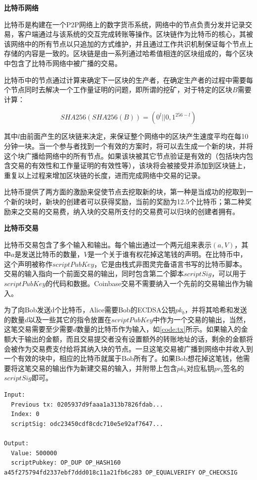 \noindent\textbf{比特币网络}

比特币是构建在一个P2P网络上的数字货币系统，网络中的节点负责分发并记录交易，客户端通过与该系统的交互完成转账等操作。区块链作为比特币的核心，其被该网络中的所有节点以只追加的方式维护，并且通过工作共识机制保证每个节点上存储的内容是一致的。区块链是由一系列通过哈希值相连的区块组成的，每个区块中包含了比特币网络中被广播的交易。

比特币中的节点通过计算来确定下一区块的生产者，在确定生产者的过程中需要每个节点同时去解决一个工作量证明的问题，即所谓的挖矿，对于特定的区块$B$需要计算：

\begin{equation}\label{eqGenCmpPk}
SHA256(SHA256(B)) = (0^l||{0,1}^{256-l})
\end{equation}

其中$l$由前面产生的区块链来决定，来保证整个网络中的区块产生速度平均在每10分钟一块。当一个参与者找到一个有效的方案时，将可以去生成一个新的块，并将这个块广播给网络中的所有节点。如果该块被其它节点验证是有效的（包括块内包含交易的有效性和工作量证明的有效性等），该块将会被接受并添加到区块链上，重复以上过程来增加区块链的长度，进而完成网络中交易的记录。

比特币提供了两方面的激励来促使节点去挖取新的块，第一种是当成功的挖取到一个新的块时，新块的创建者可以获得奖励，当前的奖励为12.5个比特币；第二种奖励来之交易的交易费，纳入块的交易所支付的交易费可以归块的创建者拥有。


\noindent\textbf{比特币交易}

比特币交易包含了多个输入和输出。每个输出通过一个两元组来表示$(a,V)$，其中$a$是发送比特币的数量，$V$是一个关于谁有权花掉这笔钱的声明。在比特币中，这个声明被称作$scriptPubKey$，它是由栈式非图灵完备语言书写的比特币脚本。交易的输入指向一个前面交易的输出，同时包含第二个脚本$scriptSig$，可以用于$scriptPubKey$的代码和数据。Coinbase交易不需要纳入一个先前的交易输出作为输入。

为了向Bob发送d个比特币，Alice需要Bob的ECDSA公钥$pk_b$，并将其哈希和发送的数量$d$以及一些其它的指令放置在$scriptPubKey$中作为一个交易的输出，当然，这笔交易需要至少需要$d$数量的比特币作为输入，如\ref{code:tx}所示。如果输入的金额大于输出的金额，而且交易提交者没有设置额外的转账地址的话，剩余的金额将会被作为交易费支付给将其纳入块的节点。一旦这笔交易被广播到网络中并收入到一个有效的块中，相应的比特币就属于Bob所有了。如果Bob想花掉这笔钱，他需要将这笔交易的输出作为新建交易的输入，并附带上包含$pk_b$对应私钥$pr_b$签名的$scriptSig$即可。

\begin{lstlisting}[caption={比特币交易实例}, label=code:tx]
Input:
  Previous tx: 0205937d9faaa1a313b7826fdab...
  Index: 0
  scriptSig: odc23450cdf8cdc710e5e92af7647...

Output:
  Value: 500000
  scriptPubkey: OP_DUP OP_HASH160 a45f275794fd2337ebf7ddd018c11a21fb6c283 OP_EQUALVERIFY OP_CHECKSIG

\end{lstlisting}


